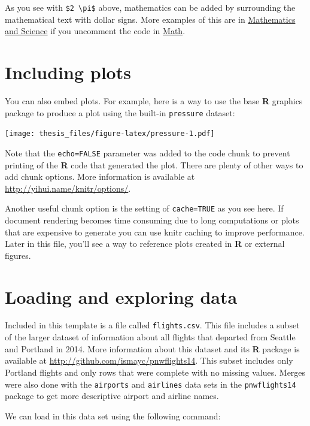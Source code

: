 \documentclass[12pt,twoside]{reedthesis}
\theoremstyle{definition}
\theoremstyle{definition}
\theoremstyle{definition}
\theoremstyle{remark}
\begin{document}
As you see with \texttt{\$2\ \textbackslash{}pi\$} above, mathematics
can be added by surrounding the mathematical text with dollar signs.
More examples of this are in \protect\hyperlink{math-sci}{Mathematics
and Science} if you uncomment the code in
\protect\hyperlink{math}{Math}.

\hypertarget{including-plots}{%
\section{Including plots}\label{including-plots}}

You can also embed plots. For example, here is a way to use the base
\textbf{R} graphics package to produce a plot using the built-in
\texttt{pressure} dataset:

\texttt{[image: thesis\_files/figure-latex/pressure-1.pdf]}

Note that the \texttt{echo=FALSE} parameter was added to the code chunk
to prevent printing of the \textbf{R} code that generated the plot.
There are plenty of other ways to add chunk options. More information is
available at \url{http://yihui.name/knitr/options/}.

Another useful chunk option is the setting of \texttt{cache=TRUE} as you
see here. If document rendering becomes time consuming due to long
computations or plots that are expensive to generate you can use knitr
caching to improve performance. Later in this file, you'll see a way to
reference plots created in \textbf{R} or external figures.

\hypertarget{loading-and-exploring-data}{%
\section{Loading and exploring data}\label{loading-and-exploring-data}}

Included in this template is a file called \texttt{flights.csv}. This
file includes a subset of the larger dataset of information about all
flights that departed from Seattle and Portland in 2014. More
information about this dataset and its \textbf{R} package is available
at \url{http://github.com/ismayc/pnwflights14}. This subset includes
only Portland flights and only rows that were complete with no missing
values. Merges were also done with the \texttt{airports} and
\texttt{airlines} data sets in the \texttt{pnwflights14} package to get
more descriptive airport and airline names.

We can load in this data set using the following command:
\end{document}
